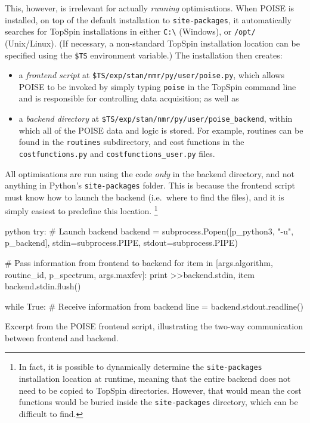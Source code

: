 This, however, is irrelevant for actually \textit{running} optimisations.
When POISE is installed, on top of the default installation to \texttt{site-packages}, it automatically searches for TopSpin installations in either \texttt{C:\textbackslash} (Windows), or \texttt{/opt/} (Unix/Linux).
(If necessary, a non-standard TopSpin installation location can be specified using the \texttt{\$TS} environment variable.)
The installation then creates:
\begin{itemize}
    \item a \textit{frontend script} at \texttt{\$TS/exp/stan/nmr/py/user/poise.py}, which allows POISE to be invoked by simply typing \texttt{poise} in the TopSpin command line and is responsible for controlling data acquisition; as well as
    \item a \textit{backend directory} at \texttt{\$TS/exp/stan/nmr/py/user/poise\_backend}, within which all of the POISE data and logic is stored.
        For example, routines can be found in the \texttt{routines} subdirectory, and cost functions in the \texttt{costfunctions.py} and \texttt{costfunctions\_user.py} files.
\end{itemize}
All optimisations are run using the code \textit{only} in the backend directory, and not anything in Python's \texttt{site-packages} folder.
This is because the frontend script must know how to launch the backend (i.e.\ where to find the files), and it is simply easiest to predefine this location.%
\footnote{In fact, it is possible to dynamically determine the \texttt{site-packages} installation location at runtime, meaning that the entire backend does not need to be copied to TopSpin directories.
However, that would mean the cost functions would be buried inside the \texttt{site-packages} directory, which can be difficult to find.}

\begin{mylisting}[!ht]
\begin{tcbminted}{python}
try:
    # Launch backend
    backend = subprocess.Popen([p_python3, "-u", p_backend],
                               stdin=subprocess.PIPE,
                               stdout=subprocess.PIPE)

    # Pass information from frontend to backend
    for item in [args.algorithm, routine_id, p_spectrum, args.maxfev]:
        print >>backend.stdin, item
    backend.stdin.flush()

    while True:
        # Receive information from backend
        line = backend.stdout.readline()
\end{tcbminted}
    \caption[Communication between frontend and backend in POISE]{Excerpt from the POISE frontend script, illustrating the two-way communication between frontend and backend.}
    \label{lst:poise_communication}
\end{mylisting}

